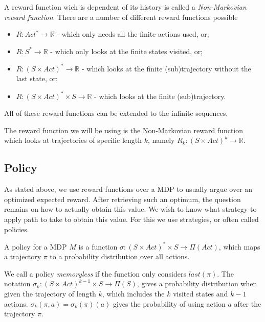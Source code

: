 
A reward function wich is dependent of its history is called a \textit{Non-Markovian reward function}. There are a number of different reward functions possible
\begin{itemize}
	\item $R:Act^*\to\mathbb{R}$ - which only needs all the finite actions used, or;
	\item $R:S^*\to\mathbb{R}$ - which only looks at the finite states visited, or;
	\item $R:(S\times Act)^*\to\mathbb{R}$ - which looks at the finite (sub)trajectory without the last state, or;
	\item $R:(S\times Act)^*\times S\to \mathbb{R}$ - which looks at the finite (sub)trajectory.
\end{itemize}
All of these reward functions can be extended to the infinite sequences. 

The reward function we will be using is the Non-Markovian reward function which looks at trajectories of specific length $k$, namely $R_k:(S\times Act)^k\to\mathbb{R}$. 



\subsection*{Policy}
As stated above, we use reward functions over a MDP to usually argue over an optimized expected reward. After retrieving such an optimum, the question remains on how to actually obtain this value. We wish to know what strategy to apply path to take to obtain this value. For this we use strategies, or often called policies. 

\begin{definition}
	A policy for a MDP $M$ is a function $\sigma:(S\times Act)^*\times S \to \Pi(Act)$, which maps a trajectory $\pi$ to a probability distribution over all actions. 
\end{definition}

We call a policy \textit{memoryless} if the function only considers $last(\pi)$. The notation $\sigma_k:(S\times Act)^{k-1}\times S\to \Pi(S)$, gives a probability distribution when given the trajectory of length $k$, which includes the $k$ visited states and $k-1$ actions. $\sigma_k(\pi,a)=\sigma_k(\pi)(a)$ gives the probability of using action $a$ after the trajectory $\pi$.

